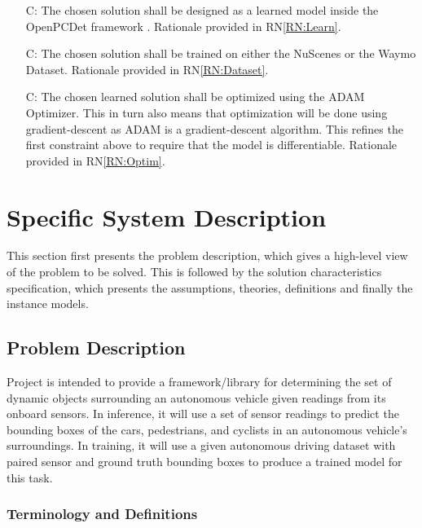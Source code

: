 \documentclass[12pt]{article}
\newcounter{consnum} %
\newcommand{\rnref}[1]{RN\ref{#1}}
\begin{document}
\noindent \begin{itemize}
\item[C\refstepcounter{consnum}\theconsnum\label{C1}:] The chosen solution shall be designed as a learned model inside the OpenPCDet framework \cite{openpcdet2020}. Rationale provided in \rnref{RN:Learn}.

\item[C\refstepcounter{consnum}\theconsnum\label{C2}:] The chosen solution shall be trained on either the NuScenes \cite{caesar2020nuscenes} or the Waymo \cite{sun2020scalability} Dataset. Rationale provided in \rnref{RN:Dataset}.

\item[C\refstepcounter{consnum}\theconsnum\label{C3}:] The chosen learned solution shall be optimized using the ADAM Optimizer. This in turn also means that optimization will be done using gradient-descent as ADAM is a gradient-descent algorithm. This refines the first constraint above to require that the model is differentiable. Rationale provided in \rnref{RN:Optim}.
\end{itemize}
  
 
\section{Specific System Description}

This section first presents the problem description, which gives a high-level
view of the problem to be solved.  This is followed by the solution characteristics
specification, which presents the assumptions, theories, definitions and finally
the instance models.

\subsection{Problem Description} \label{Sec_pd}
Project is intended to provide a framework/library for determining the set of dynamic objects 
surrounding an autonomous vehicle given readings from its onboard sensors. In inference,
it will use a set of sensor readings to predict the bounding boxes of the cars, pedestrians,
and cyclists in an autonomous vehicle's surroundings. In training, it will use a given autonomous
driving dataset with paired sensor and ground truth bounding boxes to produce a trained model
for this task.


\subsubsection{Terminology and  Definitions}
\end{document}
